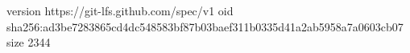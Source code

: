 version https://git-lfs.github.com/spec/v1
oid sha256:ad3be7283865cd4dc548583bf87b03baef311b0335d41a2ab5958a7a0603cb07
size 2344
